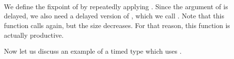 \begin{code}%
\>[0]\AgdaSpace{}%
\AgdaSymbol{:}\AgdaSpace{}%
\AgdaSymbol{\{}\AgdaSpace{}%
\AgdaSymbol{:}\AgdaSpace{}%
\AgdaSymbol{\}}\AgdaSpace{}%
\AgdaSpace{}%
\AgdaSymbol{(}\AgdaSpace{}%
\AgdaSpace{}%
\AgdaSpace{}%
\AgdaSymbol{)}\AgdaSpace{}%
\AgdaSpace{}%
\AgdaSpace{}%
\<%
\\
\>[0]\AgdaSpace{}%
\AgdaSymbol{:}\AgdaSpace{}%
\AgdaSymbol{\{}\AgdaSpace{}%
\AgdaSymbol{:}\AgdaSpace{}%
\AgdaSymbol{\}}\AgdaSpace{}%
\AgdaSpace{}%
\AgdaSymbol{(}\AgdaSpace{}%
\AgdaSpace{}%
\AgdaSpace{}%
\AgdaSymbol{)}\AgdaSpace{}%
\AgdaSpace{}%
\AgdaSpace{}%
\AgdaSymbol{(}\AgdaSpace{}%
\AgdaSymbol{)}\<%
\\
\>[0]\AgdaSpace{}%
\AgdaSpace{}%
\AgdaSymbol{\{}\AgdaSymbol{\}}\AgdaSpace{}%
\AgdaSymbol{=}\AgdaSpace{}%
\AgdaSpace{}%
\AgdaSymbol{(}\AgdaSpace{}%
\AgdaSpace{}%
\AgdaSymbol{\{}\AgdaSymbol{\})}\<%
\\
\>[0]\AgdaSpace{}%
\AgdaSymbol{(}\AgdaSpace{}%
\AgdaSpace{}%
\AgdaSymbol{\{}\AgdaSymbol{\})}\AgdaSpace{}%
\AgdaSymbol{\{}\AgdaSymbol{\}}\AgdaSpace{}%
\AgdaSymbol{=}\AgdaSpace{}%
\AgdaSpace{}%
\AgdaSpace{}%
\AgdaSymbol{\{}\AgdaSymbol{\}}\<%
\end{code}

We define the fixpoint of  by repeatedly applying .
Since the argument of  is delayed, we also need a delayed version of , which we call .
Note that this function calls  again, but the size decreases.
For that reason, this function is actually productive.

Now let us discuss an example of a timed type which uses .

\begin{code}%
\>[0]\AgdaSpace{}%
\AgdaSpace{}%
\AgdaSymbol{:}\AgdaSpace{}%
\AgdaSpace{}%
\<%
\\
\>[0][@{}l@{\AgdaIndent{0}}]%
\>[2]\AgdaSpace{}%
\AgdaSymbol{:}\AgdaSpace{}%
\AgdaSpace{}%
\<%
\\
%
\>[2]\AgdaSpace{}%
\AgdaSymbol{:}\AgdaSpace{}%
\AgdaSymbol{(}\AgdaSpace{}%
\AgdaSpace{}%
\AgdaSpace{}%
\AgdaSymbol{)}\<%
\end{code}

